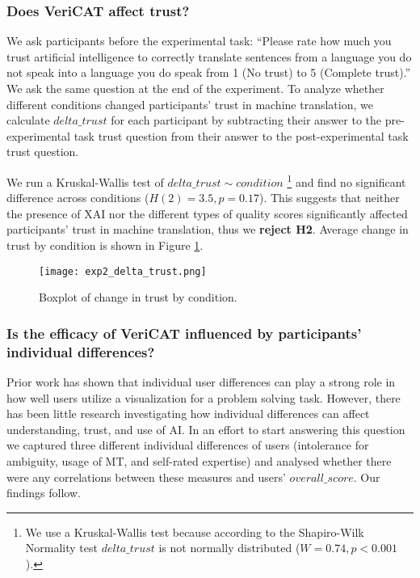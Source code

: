 \subsubsection{\textbf{Does VeriCAT affect trust?}}

We ask participants before the experimental task: “Please rate how much you trust artificial intelligence to correctly translate sentences from a language you do not speak into a language you do speak from 1 (No trust) to 5 (Complete trust).”  We ask the same question at the end of the experiment. To analyze whether different conditions changed participants' trust in machine translation, we calculate $delta\_trust$ for each participant by subtracting their answer to the pre-experimental task trust question from their answer to the post-experimental task trust question. 

We run a Kruskal-Wallis test of $delta\_trust \sim condition$ \footnote{We use a Kruskal-Wallis test because according to the Shapiro-Wilk Normality test $delta\_trust$ is not normally distributed ($W = 0.74, p < 0.001$).} and find no significant difference across conditions ($H(2) = 3.5, p = 0.17$). This suggests that neither the presence of XAI nor the different types of quality scores significantly affected participants’ trust in machine translation, thus we \textbf{reject H2}. Average change in trust by condition is shown in Figure \ref{fig:exp_delta_trust}.

\begin{figure}[h!]
    \centering
    \texttt{[image: exp2\_delta\_trust.png]}
    \caption{Boxplot of change in trust by condition.}
    \label{fig:exp_delta_trust}
\end{figure}

\subsubsection{\textbf{Is the efficacy of VeriCAT influenced by participants' individual differences?}}

Prior work has shown that individual user differences can play a strong role in how well users utilize a visualization for a problem solving task\cite{liuSurvey2020}. However, there has been little research investigating how individual differences can affect understanding, trust, and use of AI. In an effort to start answering this question we captured three different individual differences of users (intolerance for ambiguity, usage of MT, and self-rated expertise) and analysed whether there were any correlations between these measures and users’ $overall\_score$. Our findings follow.

